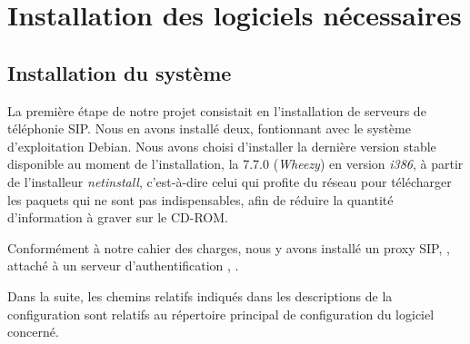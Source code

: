 \section{Installation des logiciels nécessaires}

\subsection{Installation du système}

La première étape de notre projet consistait en l’installation de serveurs de téléphonie SIP. Nous en avons installé deux, fontionnant avec le système d’exploitation Debian. Nous avons choisi d’installer la dernière version stable disponible au moment de l’installation, la 7.7.0 (\textit{Wheezy}) en version \textit{i386}, à partir de l’installeur \textit{netinstall}, c’est-à-dire celui qui profite du réseau pour télécharger les paquets qui ne sont pas indispensables, afin de réduire la quantité d’information à graver sur le CD-ROM.

Conformément à notre cahier des charges, nous y avons installé un proxy SIP, {\kam}, attaché à un serveur d’authentification {\rad}, {\frad}.

Dans la suite, les chemins relatifs indiqués dans les descriptions de la configuration sont relatifs au répertoire principal de configuration du logiciel concerné.




